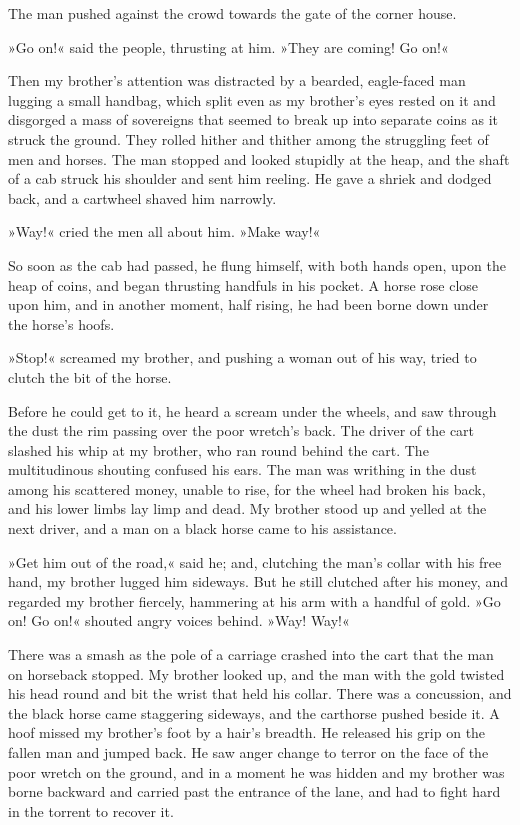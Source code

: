 The man pushed against the crowd towards the gate of the corner house.

»Go on!« said the people, thrusting at him. »They are coming! Go on!«

Then my brother's attention was distracted by a bearded, eagle-faced man lugging a small handbag, which split even as my brother's eyes rested on it and disgorged a mass of sovereigns that seemed to break up into separate coins as it struck the ground. They rolled hither and thither among the struggling feet of men and horses. The man stopped and looked stupidly at the heap, and the shaft of a cab struck his shoulder and sent him reeling. He gave a shriek and dodged back, and a cartwheel shaved him narrowly.

»Way!« cried the men all about him. »Make way!«

So soon as the cab had passed, he flung himself, with both hands open, upon the heap of coins, and began thrusting handfuls in his pocket. A horse rose close upon him, and in another moment, half rising, he had been borne down under the horse's hoofs.

»Stop!« screamed my brother, and pushing a woman out of his way, tried to clutch the bit of the horse.

Before he could get to it, he heard a scream under the wheels, and saw through the dust the rim passing over the poor wretch's back. The driver of the cart slashed his whip at my brother, who ran round behind the cart. The multitudinous shouting confused his ears. The man was writhing in the dust among his scattered money, unable to rise, for the wheel had broken his back, and his lower limbs lay limp and dead. My brother stood up and yelled at the next driver, and a man on a black horse came to his assistance.

»Get him out of the road,« said he; and, clutching the man's collar with his free hand, my brother lugged him sideways. But he still clutched after his money, and regarded my brother fiercely, hammering at his arm with a handful of gold. »Go on! Go on!« shouted angry voices behind. »Way! Way!«

There was a smash as the pole of a carriage crashed into the cart that the man on horseback stopped. My brother looked up, and the man with the gold twisted his head round and bit the wrist that held his collar. There was a concussion, and the black horse came staggering sideways, and the carthorse pushed beside it. A hoof missed my brother's foot by a hair's breadth. He released his grip on the fallen man and jumped back. He saw anger change to terror on the face of the poor wretch on the ground, and in a moment he was hidden and my brother was borne backward and carried past the entrance of the lane, and had to fight hard in the torrent to recover it.

